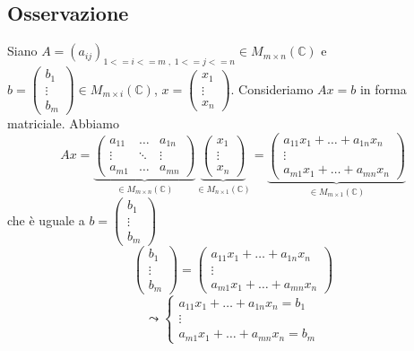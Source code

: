 \documentclass[a4paper]{article}
\theoremstyle{break}
\theoremstyle{break}
\theoremstyle{break}
\theoremstyle{break}
\begin{document}
\subsection{Osservazione}
Siano \( A = (a_{ij})_{1<=i<=m\;,\;1<=j<=n} \in M_{m \times n}(\mathbb{C}) \) e
\( b = \begin{pmatrix} b_1 \\ \vdots \\ b_m \end{pmatrix} \in M_{m \times i}(\mathbb{C}) \),
\( x = \begin{pmatrix} x_1 \\ \vdots \\ x_n \end{pmatrix}  \).
Consideriamo \( Ax=b \) in forma matriciale. Abbiamo
\[
  Ax = \underbrace{\begin{pmatrix} 
  a_{11} & \ldots & a_{1n}\\
  \vdots & \ddots & \vdots\\
  a_{m1} & \ldots & a_{mn}
\end{pmatrix}}_{\in M_{m \times n}(\mathbb{C})}
\underbrace{\begin{pmatrix} 
  x_1\\
  \vdots\\
  x_n
\end{pmatrix}}_{\in M_{n \times 1}(\mathbb{C})}
=
\underbrace{\begin{pmatrix} 
  a_{11}x_1 + \ldots + a_{1n}x_n\\
  \vdots\\
  a_{m1}x_1 + \ldots + a_{mn}x_n
\end{pmatrix}}_{\in M_{m \times 1}(\mathbb{C})}
\]
che è uguale a \( b = \begin{pmatrix} b_1 \\ \vdots \\ b_m \end{pmatrix}  \) 
\[
\begin{pmatrix} 
  b_1\\
  \vdots\\
  b_m
\end{pmatrix} 
=
\begin{pmatrix} 
  a_{11}x_1 + \ldots + a_{1n}x_n\\
  \vdots\\
  a_{m1}x_1 + \ldots + a_{mn}x_n
\end{pmatrix} 
\] 
\[
\leadsto \begin{cases}
  a_{11}x_1 + \ldots + a_{1n}x_n = b_1\\
  \vdots\\
  a_{m1}x_1 + \ldots + a_{mn}x_n = b_m
\end{cases}
\] 
\end{document}
